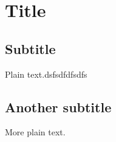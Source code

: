 \documentclass{article}
\begin{document}
\section{Title}

\subsection{Subtitle}

Plain text.dsfsdfdfsdfs

\subsection{Another subtitle}

More plain text.
\end{document}

